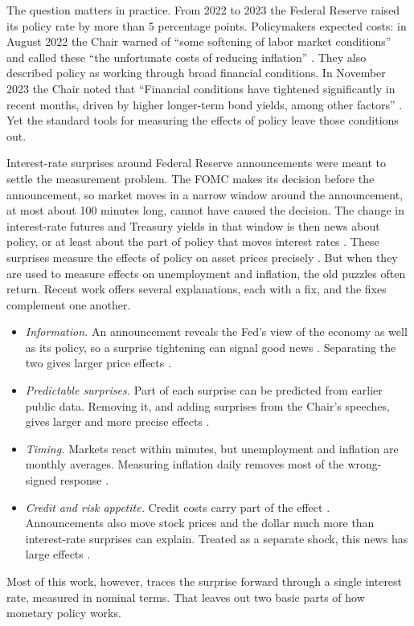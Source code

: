 \documentclass[11pt]{article}
\begin{document}
The question matters in practice. From 2022 to 2023 the Federal Reserve raised its policy rate by more than 5 percentage points. Policymakers expected costs: in August 2022 the Chair warned of ``some softening of labor market conditions'' and called these ``the unfortunate costs of reducing inflation'' \citep{powell2022}. They also described policy as working through broad financial conditions. In November 2023 the Chair noted that ``Financial conditions have tightened significantly in recent months, driven by higher longer-term bond yields, among other factors'' \citep{powell2023}. Yet the standard tools for measuring the effects of policy leave those conditions out.

Interest-rate surprises around Federal Reserve announcements were meant to settle the measurement problem. The FOMC makes its decision before the announcement, so market moves in a narrow window around the announcement, at most about 100 minutes long, cannot have caused the decision. The change in interest-rate futures and Treasury yields in that window is then news about policy, or at least about the part of policy that moves interest rates \citep{kuttner2001,gurkaynak2005}. These surprises measure the effects of policy on asset prices precisely \citep{bernanke2005,hanson2015,nakamura2018,swanson2021}. But when they are used to measure effects on unemployment and inflation, the old puzzles often return. Recent work offers several explanations, each with a fix, and the fixes complement one another.
\begin{itemize}
\item \emph{Information.} An announcement reveals the Fed's view of the economy as well as its policy, so a surprise tightening can signal good news \citep{romer2000,nakamura2018}. Separating the two gives larger price effects \citep{jarocinski2020,miranda2021}.
\item \emph{Predictable surprises.} Part of each surprise can be predicted from earlier public data. Removing it, and adding surprises from the Chair's speeches, gives larger and more precise effects \citep{bauer2023,bauer2023aer}.
\item \emph{Timing.} Markets react within minutes, but unemployment and inflation are monthly averages. Measuring inflation daily removes most of the wrong-signed response \citep{jacobson2026}.
\item \emph{Credit and risk appetite.} Credit costs carry part of the effect \citep{gertler2015,caldara2019}. Announcements also move stock prices and the dollar much more than interest-rate surprises can explain. Treated as a separate shock, this news has large effects \citep{kroencke2021,bauer2023jep,boehm2024,bauer2026,boehm2026}.
\end{itemize}
Most of this work, however, traces the surprise forward through a single interest rate, measured in nominal terms. That leaves out two basic parts of how monetary policy works.
\end{document}

